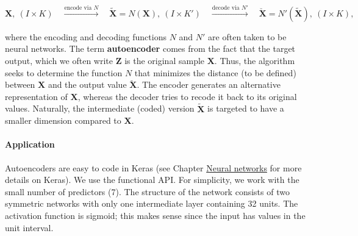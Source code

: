 \begin{equation}
\label{eq:aescheme2}
\textbf{X},\ (I\times K) \quad \overset{\text{encode via } N} {\longrightarrow} \quad \tilde{\textbf{X}}=N(\textbf{X}), \ (I \times K') \quad \overset{\text{decode via } N'}{\longrightarrow} \quad \breve{\textbf{X}}=N'(\tilde{\textbf{X}}), \ (I \times K),
\end{equation}

where the encoding and decoding functions $N$ and $N'$ are often taken to be neural networks. The term \textbf{autoencoder} comes from the fact that the target output, which we often write $\textbf{Z}$ is the original sample $\textbf{X}$. Thus, the algorithm seeks to determine the function $N$ that minimizes the distance (to be defined) between $\textbf{X}$ and the output value $\breve{\textbf{X}}$. The encoder generates an alternative representation of $\textbf{X}$, whereas the decoder tries to recode it back to its original values. Naturally, the intermediate (coded) version $\tilde{\textbf{X}}$ is targeted to have a smaller dimension compared to $\textbf{X}$.

\paragraph{Application}

Autoencoders are easy to code in Keras (see Chapter \href{/chap-08-neural-networks}{Neural networks} for more details on Keras). We use the functional API. For simplicity, we work with the small number of predictors (7). The structure of the network consists of two symmetric networks with only one intermediate layer containing 32 units. The activation function is sigmoid; this makes sense since the input has values in the unit interval.

